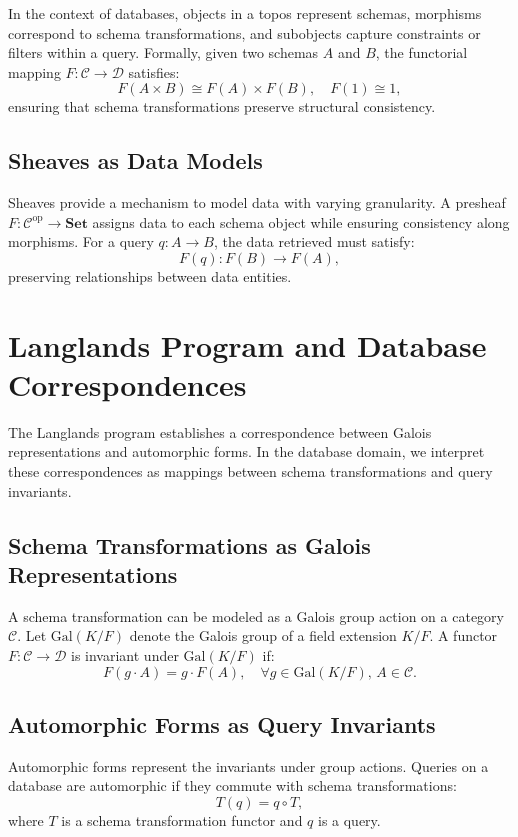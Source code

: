 \documentclass[12pt]{article}
\begin{document}
In the context of databases, objects in a topos represent schemas, morphisms correspond to schema transformations, and subobjects capture constraints or filters within a query. Formally, given two schemas $A$ and $B$, the functorial mapping $F: \mathcal{C} \to \mathcal{D}$ satisfies:
\[
F(A \times B) \cong F(A) \times F(B), \quad F(1) \cong 1,
\]
ensuring that schema transformations preserve structural consistency.

\subsection{Sheaves as Data Models}
Sheaves provide a mechanism to model data with varying granularity. A presheaf $F: \mathcal{C}^{\mathrm{op}} \to \mathbf{Set}$ assigns data to each schema object while ensuring consistency along morphisms. For a query $q: A \to B$, the data retrieved must satisfy:
\[
F(q): F(B) \to F(A),
\]
preserving relationships between data entities.

\section{Langlands Program and Database Correspondences}

The Langlands program establishes a correspondence between Galois representations and automorphic forms. In the database domain, we interpret these correspondences as mappings between schema transformations and query invariants. 

\subsection{Schema Transformations as Galois Representations}
A schema transformation can be modeled as a Galois group action on a category $\mathcal{C}$. Let $\mathrm{Gal}(K/F)$ denote the Galois group of a field extension $K/F$. A functor $F: \mathcal{C} \to \mathcal{D}$ is invariant under $\mathrm{Gal}(K/F)$ if:
\[
F(g \cdot A) = g \cdot F(A), \quad \forall g \in \mathrm{Gal}(K/F), \, A \in \mathcal{C}.
\]

\subsection{Automorphic Forms as Query Invariants}
Automorphic forms represent the invariants under group actions. Queries on a database are automorphic if they commute with schema transformations:
\[
T(q) = q \circ T,
\]
where $T$ is a schema transformation functor and $q$ is a query.
\end{document}
